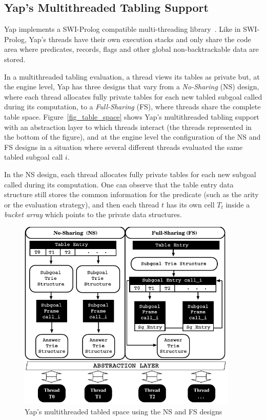 \documentclass{llncs}
\begin{document}
\subsection{Yap's Multithreaded Tabling Support}

Yap implements a SWI-Prolog compatible multi-threading
library~\cite{Wielemaker-03}. Like in SWI-Prolog, Yap's threads have
their own execution stacks and only share the code area where
predicates, records, flags and other global non-backtrackable data are
stored. 

In a multithreaded tabling evaluation, a thread views its tables as
private but, at the engine level, Yap has three designs that vary from
a \emph{No-Sharing} (NS) design, where each thread allocates fully
private tables for each new tabled subgoal called during its
computation, to a \emph{Full-Sharing} (FS), where threads share the
complete table space. Figure~\ref{fig_table_space} shows Yap's
multithreaded tabling support with an abstraction layer to which
threads interact (the threads represented in the bottom of the
figure), and at the engine level the configuration of the NS and FS
designs in a situation where several different threads evaluated the
same tabled subgoal call $i$. 

In the NS design, each thread allocates fully private tables for each
new subgoal called during its computation. One can observe that the
table entry data structure still stores the common information for the
predicate (such as the arity or the evaluation strategy), and then
each thread $t$ has its own cell $T_t$ inside a \emph{bucket array}
which points to the private data structures.

\begin{figure}[!ht]
\centering
\includegraphics[width=10.5cm]{figures/yap-mt.pdf}
\caption{Yap's multithreaded tabled space using the NS and FS designs}
\label{fig_yap_mt_support}
\end{figure}
\end{document}
